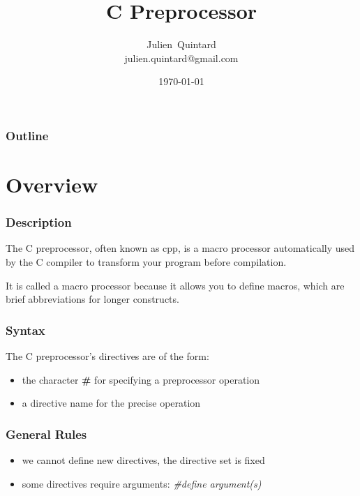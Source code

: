 \documentclass[8pt]{beamer}
\title{C Preprocessor}
\author
{
  Julien~Quintard\inst{1} \\
  {\tiny julien.quintard@gmail.com}
}
\institute
{
  \inst{1} kaneton microkernel project
}
\date{\today}
\newcommand{\nl}[0]{\vspace{0.4cm}}
\begin{document}
%
%

\begin{frame}
  \titlepage

  \begin{center}
     \hspace{0.1cm}  \hspace{0.1cm}
     \hspace{0.1cm}
  \end{center}
\end{frame}

%
%

\begin{frame}
  \frametitle{Outline}
  \tableofcontents
\end{frame}

%
%

\section{Overview}


\begin{frame}
  \frametitle{Description}

  The C preprocessor, often known as cpp, is a macro processor
  automatically used by the C compiler to transform your program
  before compilation.

  \nl

  It is called a macro processor because it allows you to define macros,
  which are brief abbreviations for longer constructs.
\end{frame}


\begin{frame}
  \frametitle{Syntax}

  The C preprocessor's directives are of the form:

  \begin{itemize}[<+->]
    \item
      the character \textbf{\#} for specifying a preprocessor operation
    \item
      a directive name for the precise operation
  \end{itemize}
\end{frame}


\begin{frame}
  \frametitle{General Rules}

  \begin{itemize}[<+->]
    \item
      we \alert{cannot} define new directives, the directive set is fixed
    \item
      some directives require arguments: \textit{\#define argument(s)}
  \end{itemize}
\end{frame}
\end{document}
